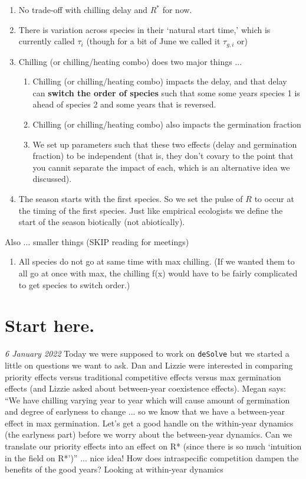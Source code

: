 \documentclass[11pt,letter]{article}
\begin{document}
\begin{enumerate}
\item No trade-off with chilling delay and $R^*$ for now. 
\item There is variation across species in their `natural start time,' which is currently called $\tau_{i}$ (though for a bit of June we called it $\tau_{g,i}$ or)
\item Chilling (or chilling/heating combo) does two major things ... 
\begin{enumerate}
\item Chilling (or chilling/heating combo) impacts the delay, and that delay can {\bf switch the order of species} such that some some years species 1 is ahead of species 2 and some years that is reversed.
\item Chilling (or chilling/heating combo) also impacts the germination fraction
\item We set up parameters such that these two effects (delay and germination fraction) to be independent (that is, they don't covary to the point that you cannit separate the impact of each, which is an alternative idea we discussed). 
\end{enumerate}
\item The season starts with the first species. So we set the pulse of $R$ to occur at the timing of the first species. Just like empirical ecologists we define the start of the season biotically (not abiotically). 
\end{enumerate}

Also ... smaller things (SKIP reading for meetings)
\begin{enumerate}
\item All species do not go at same time with max chilling. (If we wanted them to all go at once with max, the chilling f(x) would have to be fairly complicated to get species to switch order.) 
\end{enumerate}

\section{Start here.} 

\emph{6 January 2022} Today we were supposed to work on \verb|deSolve| but we started a little on questions we want to ask. Dan and Lizzie were interested in comparing priority effects versus traditional competitive effects versus max germination effects (and Lizzie asked about between-year coexistence effects). Megan says: ``We have chilling varying year to year which will cause amount of germination and degree of earlyness to change ... so we know that we have a between-year effect in max germination. Let's get a good handle on the within-year dynamics (the earlyness part) before we worry about the between-year dynamics. Can we translate our priority effects into an effect on R* (since there is so much `intuition in the field on R*')'' ... nice idea! How does intraspecific competition dampen the benefits of the good years? Looking at within-year dynamics \\
\end{document}
